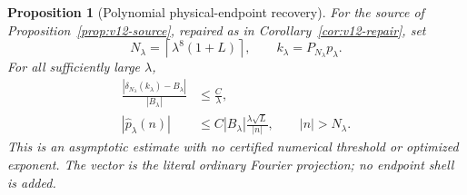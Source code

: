 \documentclass[11pt]{article}
\newtheorem{proposition}[theorem]{Proposition}
\theoremstyle{remark}
\begin{document}
\begin{proposition}[Polynomial physical-endpoint recovery]
\label{prop:v114-polynomial-endpoint}
For the source of Proposition~\ref{prop:v12-source}, repaired as in
Corollary~\ref{cor:v12-repair}, set
\[
 N_\lambda=\left\lceil\lambda^8(1+L)\right\rceil,
       \qquad k_\lambda=P_{N_\lambda}p_\lambda.
\]
For all sufficiently large $\lambda$,
\begin{align}
 \frac{|\delta_{N_\lambda}(k_\lambda)-B_\lambda|}{|B_\lambda|}
       &\le\frac C\lambda,\label{eq:v114-polynomial-endpoint}\\
 |\widehat p_\lambda(n)|
       &\le C|B_\lambda|\frac{\lambda\sqrt L}{|n|},
            \qquad |n|>N_\lambda.\label{eq:v114-high-tail}
\end{align}
This is an asymptotic estimate with no certified numerical threshold or
optimized exponent. The vector is the literal ordinary Fourier projection;
no endpoint shell is added.
\end{proposition}
\end{document}
